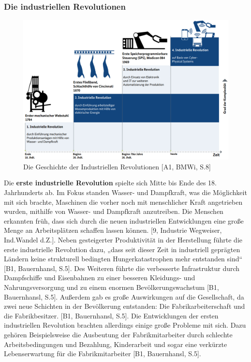 \subsubsection{Die industriellen Revolutionen}\label{sec:IndustrielleRevolution}
\begin{figure}[h]
	\centering
	\includegraphics[width=1\linewidth]{Bilder/A1_DieGeschichteDerIndustriellenRevolutionenBMWI}
	\caption{Die Geschichte der Industriellen Revolutionen [A1, BMWi, S.8]}
	\label{fig:IndustrielleRevolutionenBild}
\end{figure}
\noindent Die \textbf{erste industrielle Revolution} spielte sich Mitte bis Ende des 18. Jahrhunderts ab. Im Fokus standen Wasser- und Dampfkraft, was die Möglichkeit mit sich brachte, Maschinen die vorher noch mit menschlicher Kraft angetrieben wurden, mithilfe von Wasser- und Dampfkraft anzutreiben. Die Menschen erkannten früh, dass sich durch die neuen industriellen Entwicklungen eine große Menge an Arbeitsplätzen schaffen lassen können. [9, Industrie Wegweiser, Ind.Wandel d.Z.]. Neben gesteigerter Produktivität in der Herstellung führte die erste industrielle Revolution dazu, „dass seit dieser Zeit in industriell geprägten Ländern keine strukturell bedingten Hungerkatastrophen mehr entstanden sind“ [B1, Bauernhansl, S.5]. Des Weiteren führte die verbesserte Infrastruktur durch Dampfschiffe und Eisenbahnen zu einer besseren Kleidungs- und Nahrungsversorgung und zu einem enormen Bevölkerungswachstum [B1, Bauernhansl, S.5]. Außerdem gab es große Auswirkungen auf die Gesellschaft, da zwei neue Schichten in der Bevölkerung entstanden: Die Fabrikarbeiterschaft und die Fabrikbesitzer. [B1, Bauernhansl, S.5]. Die Entwicklungen der ersten industriellen Revolution brachten allerdings einige große Probleme mit sich. Dazu gehören Beispielsweise die Ausbeutung der Fabrikmitarbeiter durch schlechte Arbeitsbedingungen und Bezahlung, Kinderarbeit und sogar eine verkürzte Lebenserwartung für die Fabrikmitarbeiter [B1, Bauernhansl, S.5].
